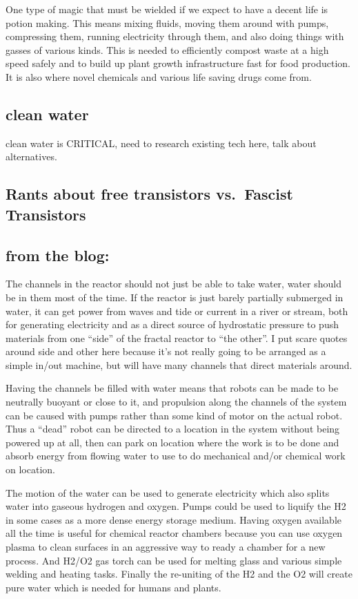 One type of magic that must be wielded if we expect to have a decent
life is potion making. This means mixing fluids, moving them around with
pumps, compressing them, running electricity through them, and also
doing things with gasses of various kinds. This is needed to efficiently
compost waste at a high speed safely and to build up plant growth
infrastructure fast for food production. It is also where novel
chemicals and various life saving drugs come from.

\subsection{clean water}\label{clean-water}

clean water is CRITICAL, need to research existing tech here, talk about
alternatives.

\subsection{Rants about free transistors vs.~Fascist
Transistors}\label{rants-about-free-transistors-vs.fascist-transistors}

\subsection{from the blog:}\label{from-the-blog}

The channels in the reactor should not just be able to take water, water
should be in them most of the time. If the reactor is just barely
partially submerged in water, it can get power from waves and tide or
current in a river or stream, both for generating electricity and as a
direct source of hydrostatic pressure to push materials from one
``side'' of the fractal reactor to ``the other''. I put scare quotes
around side and other here because it's not really going to be arranged
as a simple in/out machine, but will have many channels that direct
materials around.

Having the channels be filled with water means that robots can be made
to be neutrally buoyant or close to it, and propulsion along the
channels of the system can be caused with pumps rather than some kind of
motor on the actual robot. Thus a ``dead'' robot can be directed to a
location in the system without being powered up at all, then can park on
location where the work is to be done and absorb energy from flowing
water to use to do mechanical and/or chemical work on location.

The motion of the water can be used to generate electricity which also
splits water into gaseous hydrogen and oxygen. Pumps could be used to
liquify the H2 in some cases as a more dense energy storage medium.
Having oxygen available all the time is useful for chemical reactor
chambers because you can use oxygen plasma to clean surfaces in an
aggressive way to ready a chamber for a new process. And H2/O2 gas torch
can be used for melting glass and various simple welding and heating
tasks. Finally the re-uniting of the H2 and the O2 will create pure
water which is needed for humans and plants.

